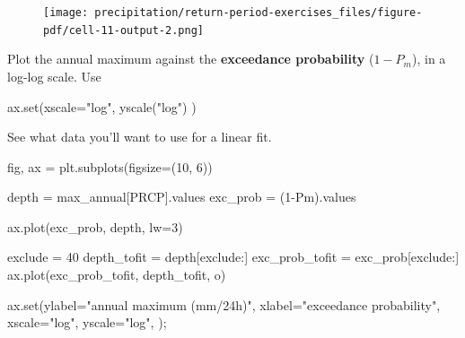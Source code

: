\documentclass[
  letterpaper,
  DIV=11,
  numbers=noendperiod]{scrreprt}
\newenvironment{Shaded}{\begin{snugshade}}{\end{snugshade}}
\newcommand{\BuiltInTok}[1]{\textcolor[rgb]{0.00,0.23,0.31}{#1}}
\newcommand{\DecValTok}[1]{\textcolor[rgb]{0.68,0.00,0.00}{#1}}
\newcommand{\NormalTok}[1]{\textcolor[rgb]{0.00,0.23,0.31}{#1}}
\newcommand{\OperatorTok}[1]{\textcolor[rgb]{0.37,0.37,0.37}{#1}}
\newcommand{\StringTok}[1]{\textcolor[rgb]{0.13,0.47,0.30}{#1}}
\begin{document}
\begin{figure}[H]

{\centering \texttt{[image: precipitation/return-period-exercises\_files/figure-pdf/cell-11-output-2.png]}

}

\end{figure}

Plot the annual maximum against the \textbf{exceedance probability}
(\(1-P_m\)), in a log-log scale. Use

\begin{Shaded}
\begin{Highlighting}[]
\NormalTok{ax.}\BuiltInTok{set}\NormalTok{(xscale}\OperatorTok{=}\StringTok{"log"}\NormalTok{,}
\NormalTok{       yscale(}\StringTok{"log"}\NormalTok{)}
\NormalTok{      )}
\end{Highlighting}
\end{Shaded}

See what data you'll want to use for a linear fit.

\begin{Shaded}
\begin{Highlighting}[]
\NormalTok{fig, ax }\OperatorTok{=}\NormalTok{ plt.subplots(figsize}\OperatorTok{=}\NormalTok{(}\DecValTok{10}\NormalTok{, }\DecValTok{6}\NormalTok{))}

\NormalTok{depth }\OperatorTok{=}\NormalTok{ max\_annual[}\StringTok{\textquotesingle{}PRCP\textquotesingle{}}\NormalTok{].values}
\NormalTok{exc\_prob }\OperatorTok{=}\NormalTok{ (}\DecValTok{1}\OperatorTok{{-}}\NormalTok{Pm).values}

\NormalTok{ax.plot(exc\_prob, depth, lw}\OperatorTok{=}\DecValTok{3}\NormalTok{)}

\NormalTok{exclude }\OperatorTok{=} \DecValTok{40}
\NormalTok{depth\_tofit }\OperatorTok{=}\NormalTok{ depth[exclude:]}
\NormalTok{exc\_prob\_tofit }\OperatorTok{=}\NormalTok{ exc\_prob[exclude:]}
\NormalTok{ax.plot(exc\_prob\_tofit, depth\_tofit, }\StringTok{\textquotesingle{}o\textquotesingle{}}\NormalTok{)}

\NormalTok{ax.}\BuiltInTok{set}\NormalTok{(ylabel}\OperatorTok{=}\StringTok{"annual maximum (mm/24h)"}\NormalTok{,}
\NormalTok{       xlabel}\OperatorTok{=}\StringTok{"exceedance probability"}\NormalTok{,}
\NormalTok{       xscale}\OperatorTok{=}\StringTok{"log"}\NormalTok{,}
\NormalTok{       yscale}\OperatorTok{=}\StringTok{"log"}\NormalTok{,}
\NormalTok{      )}\OperatorTok{;}
\end{Highlighting}
\end{Shaded}
\end{document}
